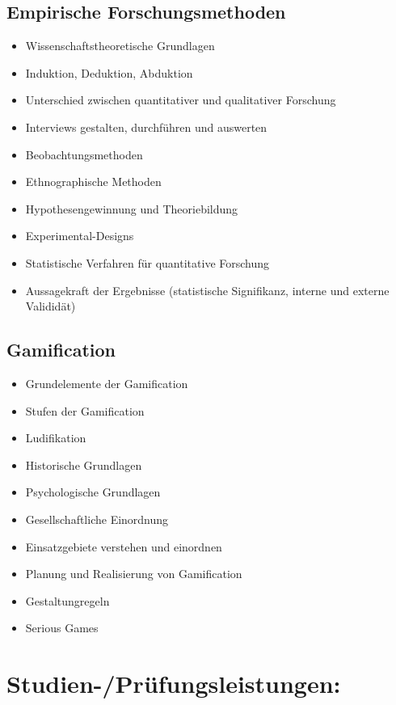 \subsection*{Empirische
Forschungsmethoden}\label{empirische-forschungsmethoden-1}

\begin{itemize}
\tightlist
\item
  Wissenschaftstheoretische Grundlagen
\item
  Induktion, Deduktion, Abduktion
\item
  Unterschied zwischen quantitativer und qualitativer Forschung
\item
  Interviews gestalten, durchführen und auswerten
\item
  Beobachtungsmethoden
\item
  Ethnographische Methoden
\item
  Hypothesengewinnung und Theoriebildung
\item
  Experimental-Designs
\item
  Statistische Verfahren für quantitative Forschung
\item
  Aussagekraft der Ergebnisse (statistische Signifikanz, interne und
  externe Valididät)
\end{itemize}

\subsection*{Gamification}\label{gamification-1}

\begin{itemize}
\tightlist
\item
  Grundelemente der Gamification
\item
  Stufen der Gamification
\item
  Ludifikation
\item
  Historische Grundlagen
\item
  Psychologische Grundlagen
\item
  Gesellschaftliche Einordnung
\item
  Einsatzgebiete verstehen und einordnen
\item
  Planung und Realisierung von Gamification
\item
  Gestaltungregeln
\item
  Serious Games
\end{itemize}

\section*{Studien-/Prüfungsleistungen:}\label{studien-pruxfcfungsleistungen-25}

